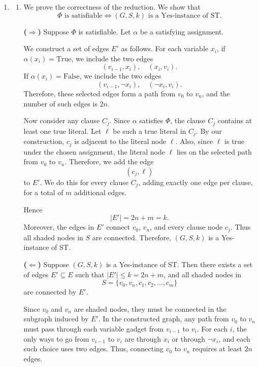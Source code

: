 \documentclass[12pt,a4paper]{article}
\makeatletter
\newtheorem*{solution}{Solution}
\theoremstyle{definition}
\renewenvironment{solution}[1][Solution] {\par\pushQED{\qed}\normalfont\topsep6\p@\@plus6\p@\relax\trivlist\item[\hskip\labelsep\bfseries#1\@addpunct{.}]\ignorespaces}{\popQED\endtrivlist\@endpefalse} \makeatother
\makeatother
\begin{document}
\begin{enumerate}
\begin{solution}
\begin{enumerate}
        \item
        We prove the correctness of the reduction. We show that
        \[
        \Phi \text{ is satisfiable}
        \iff
        (G,S,k) \text{ is a Yes-instance of ST}.
        \]

        \medskip

        \noindent\textbf{(\(\Rightarrow\))} Suppose \(\Phi\) is satisfiable.
        Let \(\alpha\) be a satisfying assignment.

        We construct a set of edges \(E'\) as follows. For each variable
        \(x_i\), if \(\alpha(x_i)=\mathrm{True}\), we include the two edges
        \[
        (v_{i-1},x_i),\quad (x_i,v_i).
        \]
        If \(\alpha(x_i)=\mathrm{False}\), we include the two edges
        \[
        (v_{i-1},\neg x_i),\quad (\neg x_i,v_i).
        \]
        Therefore, these selected edges form a path from \(v_0\) to \(v_n\),
        and the number of such edges is \(2n\).

        Now consider any clause \(C_j\). Since \(\alpha\) satisfies \(\Phi\),
        the clause \(C_j\) contains at least one true literal. Let
        \(\ell\) be such a true literal in \(C_j\). By our construction,
        \(c_j\) is adjacent to the literal node \(\ell\). Also, since
        \(\ell\) is true under the chosen assignment, the literal node
        \(\ell\) lies on the selected path from \(v_0\) to \(v_n\). Therefore,
        we add the edge
        \[
        (c_j,\ell)
        \]
        to \(E'\). We do this for every clause \(C_j\), adding exactly one
        edge per clause, for a total of \(m\) additional edges.

        Hence
        \[
        |E'|=2n+m=k.
        \]
        Moreover, the edges in \(E'\) connect \(v_0\), \(v_n\), and every
        clause node \(c_j\). Thus all shaded nodes in \(S\) are connected.
        Therefore, \((G,S,k)\) is a Yes-instance of ST.

        \medskip

        \noindent\textbf{(\(\Leftarrow\))} Suppose \((G,S,k)\) is a
        Yes-instance of ST. Then there exists a set of edges \(E'\subseteq E\)
        such that \(|E'|\leq k=2n+m\), and all shaded nodes in
        \[
        S=\{v_0,v_n,c_1,c_2,\dots,c_m\}
        \]
        are connected by \(E'\).

        Since \(v_0\) and \(v_n\) are shaded nodes, they must be connected in
        the subgraph induced by \(E'\). In the constructed graph, any path from
        \(v_0\) to \(v_n\) must pass through each variable gadget from
        \(v_{i-1}\) to \(v_i\). For each \(i\), the only ways to go from
        \(v_{i-1}\) to \(v_i\) are through \(x_i\) or through \(\neg x_i\),
        and each such choice uses two edges. Thus, connecting \(v_0\) to
        \(v_n\) requires at least \(2n\) edges.


\end{enumerate}
\end{solution}
\end{enumerate}
\end{document}
